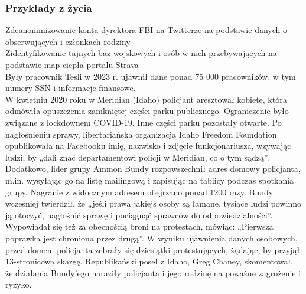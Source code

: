 \subsubsection{Przykłady z życia}
Zdeanonimizowanie konta dyrektora FBI na Twitterze na podstawie danych o obserwujących i członkach rodziny​\\
Zidentyfikowanie tajnych baz wojskowych i osób w nich przebywających na podstawie map ciepła portalu Strava\\
Były pracownik Tesli w 2023 r. ujawnił dane ponad 75 000 pracowników, w tym numery SSN i informacje finansowe.\\

W kwietniu 2020 roku w Meridian (Idaho) policjant aresztował kobietę, która odmówiła opuszczenia zamkniętej części parku publicznego. Ograniczenie było związane z lockdownem COVID-19. Inne części parku pozostały otwarte.
Po nagłośnieniu sprawy, libertariańska organizacja Idaho Freedom Foundation opublikowała na Facebooku imię, nazwisko i zdjęcie funkcjonariusza, wzywając ludzi, by „dali znać departamentowi policji w Meridian, co o tym sądzą”.
Dodatkowo, lider grupy Ammon Bundy rozpowszechnił adres domowy policjanta, m.in. wysyłając go na listę mailingową i zapisując na tablicy podczas spotkania grupy. Nagranie z widocznym adresem obejrzano ponad 1200 razy.
Bundy wcześniej twierdził, że „jeśli prawa jakiejś osoby są łamane, tysiące ludzi powinno ją otoczyć, nagłośnić sprawę i pociągnąć sprawców do odpowiedzialności”. Wypowiadał się też za obecnością broni na protestach, mówiąc: „Pierwsza poprawka jest chroniona przez drugą”.
W wyniku ujawnienia danych osobowych, przed domem policjanta zebrały się dziesiątki protestujących, żądając, by przyjął 13-stronicową skargę.
Republikański poseł z Idaho, Greg Chaney, skomentował, że działania Bundy'ego naraziły policjanta i jego rodzinę na poważne zagrożenie i ryzyko.

